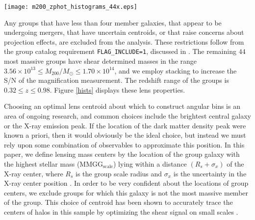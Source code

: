 \documentclass[iop]{emulateapj}
\begin{document}
\begin{figure*}
\begin{center}
\texttt{[image: m200\_zphot\_histograms\_44x.eps]}

\caption{Masses and photometric redshifts of the groups in this study. We select the most massive groups in our sample, $M_{200} / M_\odot \ge 3.56 \times 10^{13}$. Using only the cleanest groups (characterized by having $\ge$ 4 members, well-defined centroids, and no flags on possible mergers or projection effects), and applying appropriate masking, we are left with a sample of $44$ groups for this lensing magnification analysis.}
\label{hists}
\end{center}
\end{figure*}

Any groups that have less than four member galaxies, that appear to be undergoing mergers, that have uncertain centroids, or that raise concerns about projection effects, are excluded from the analysis. These restrictions follow from the group catalog requirement \texttt{FLAG\_INCLUDE=1}, discussed in \citet{George11}. The remaining $44$ most massive groups have shear determined masses in the range $ 3.56 \times 10^{13} \le M_{200} / M_\odot \le 1.70 \times 10^{14} $, and we employ stacking to increase the S/N of the magnification measurement. The redshift range of the groups is $ 0.32 \le z \le 0.98 $. Figure \ref{hists} displays these lens properties.

Choosing an optimal lens centroid about which to construct angular bins is an area of ongoing research, and common choices include the brightest central galaxy or the X-ray emission peak. If the location of the dark matter density peak were known a priori, then it would obviously be the ideal choice, but instead we must rely upon some combination of observables to approximate this position. In this paper, we define lensing mass centers by the location of the group galaxy with the highest stellar mass (MMGG$_\mathrm{scale}$) lying within a distance $ (R_s + \sigma_x) $ of the X-ray center, where $ R_s $ is the group scale radius and $ \sigma_x $ is the uncertainty in the X-ray center position \citep{George11}.  In order to be very confident about the locations of group centers, we exclude groups for which this galaxy is not the most massive member of the group. This choice of centroid has been shown to accurately trace the centers of halos in this sample by optimizing the shear signal on small scales \citep{George12}.
\end{document}
